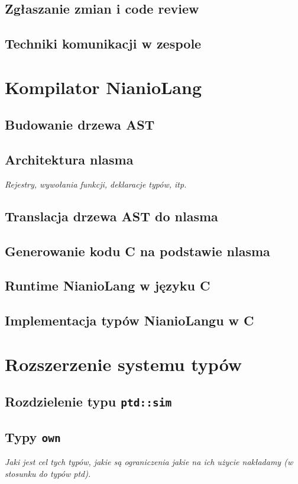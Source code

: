 \documentclass[11pt]{article}
\begin{document}
    \subsection{Zgłaszanie zmian i code review}
    \subsection{Techniki komunikacji w zespole}

    \section{Kompilator NianioLang}
    \subsection{Budowanie drzewa AST}
    \subsection{Architektura nlasma}
    \emph{Rejestry, wywołania funkcji, deklaracje typów, itp.}
    \subsection{Translacja drzewa AST do nlasma}
    \subsection{Generowanie kodu C na podstawie nlasma}
    \subsection{Runtime NianioLang w języku C}
    \subsection{Implementacja typów NianioLangu w C}

    \section{Rozszerzenie systemu typów}
    \subsection{Rozdzielenie typu \texttt{ptd::sim}}
    \subsection{Typy \texttt{own}}
    \emph{Jaki jest cel tych typów, jakie są ograniczenia jakie na ich użycie
          nakładamy (w stosunku do typów ptd).}
\end{document}
